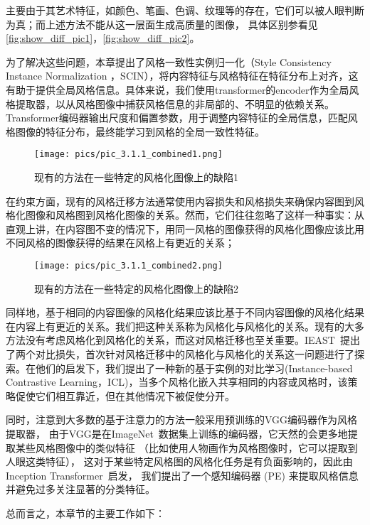 主要由于其艺术特征，如颜色、笔画、色调、纹理等的存在，它们可以被人眼判断为真；而上述方法不能从这一层面生成高质量的图像，
具体区别参看见\autoref{fig:show_diff_pic1}，\autoref{fig:show_diff_pic2}。
\par 为了解决这些问题，本章提出了风格一致性实例归一化（Style Consistency Instance Normalization ，SCIN），将内容特征与风格特征在特征分布上对齐，这有助于提供全局风格信息。具体来说，我们使用transformer的encoder作为全局风格提取器，以从风格图像中捕获风格信息的非局部的、不明显的依赖关系。Transformer编码器输出尺度和偏置参数，用于调整内容特征的全局信息，匹配风格图像的特征分布，最终能学习到风格的全局一致性特征。
\begin{figure}[htbp]
    \centering
    \texttt{[image: pics/pic\_3.1.1\_combined1.png]}
    \caption{\label{fig:show_diff_pic1}现有的方法在一些特定的风格化图像上的缺陷1}
\end{figure}
\par 在约束方面，现有的风格迁移方法通常使用内容损失和风格损失来确保内容图到风格化图像和风格图到风格化图像的关系。然而，它们往往忽略了这样一种事实：从直观上讲，在内容图不变的情况下，用同一风格的图像获得的风格化图像应该比用不同风格的图像获得的结果在风格上有更近的关系；
\begin{figure}[htbp]
    \centering
    \texttt{[image: pics/pic\_3.1.1\_combined2.png]}
    \caption{\label{fig:show_diff_pic2}现有的方法在一些特定的风格化图像上的缺陷2}
\end{figure}同样地，基于相同的内容图像的风格化结果应该比基于不同内容图像的风格化结果在内容上有更近的关系。我们把这种关系称为风格化与风格化的关系。现有的大多方法没有考虑风格化到风格化的关系，而这对风格迁移也至关重要。IEAST~\cite{chen2021artistic}提出了两个对比损失，首次针对风格迁移中的风格化与风格化的关系这一问题进行了探索。在他们的启发下，我们提出了一种新的基于实例的对比学习(Instance-based Contrastive Learning，ICL)，当多个风格化嵌入共享相同的内容或风格时，该策略促使它们相互靠近，但在其他情况下被促使分开。
\par 同时，注意到大多数的基于注意力的方法一般采用预训练的VGG编码器作为风格提取器，
由于VGG是在ImageNet~\cite{deng2009imagenet}数据集上训练的编码器，它天然的会更多地提取某些风格图像中的类似特征
（比如使用人物画作为风格图像时，它可以提取到人眼这类特征），
这对于某些特定风格图的风格化任务是有负面影响的，因此由Inception Transformer~\cite{si2022inception}启发，
我们提出了一个感知编码器 (PE) 来提取风格信息并避免过多关注显著的分类特征。
\par 总而言之，本章节的主要工作如下： 
